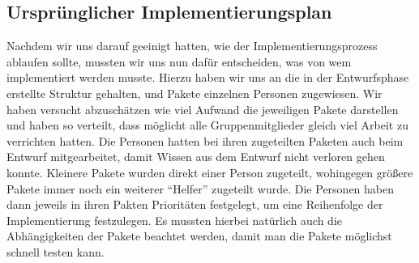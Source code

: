 \documentclass[parskip=full,11pt,twoside]{scrartcl}
\begin{document}
\subsection{Ursprünglicher Implementierungsplan}
Nachdem wir uns darauf geeinigt hatten, wie der Implementierungsprozess ablaufen sollte, mussten wir uns nun dafür entscheiden, was von wem implementiert werden musste.
Hierzu haben wir uns an die in der Entwurfsphase erstellte Struktur gehalten, und Pakete einzelnen Personen zugewiesen.
Wir haben versucht abzuschätzen wie viel Aufwand die jeweiligen Pakete darstellen und haben so verteilt, dass möglicht alle Gruppenmitglieder gleich viel Arbeit zu verrichten hatten.
Die Personen hatten bei ihren zugeteilten Paketen auch beim Entwurf mitgearbeitet, damit Wissen aus dem Entwurf nicht verloren gehen konnte.
Kleinere Pakete wurden direkt einer Person zugeteilt, wohingegen größere Pakete immer noch ein weiterer \enquote{Helfer} zugeteilt wurde. 
Die Personen haben dann jeweils in ihren Pakten Prioritäten festgelegt, um eine Reihenfolge der Implementierung festzulegen. 
Es mussten hierbei natürlich auch die Abhängigkeiten der Pakete beachtet werden, damit man die Pakete möglichst schnell testen kann.
\end{document}

